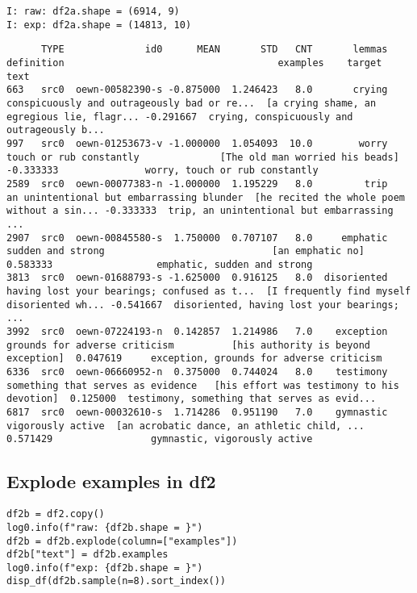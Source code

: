 \documentclass[a4paper,10pt,onecolumn,oneside,openright]{article}
\begin{document}
\begin{verbatim}
I: raw: df2a.shape = (6914, 9)
I: exp: df2a.shape = (14813, 10)
\end{verbatim}
\begin{verbatim}
      TYPE              id0      MEAN       STD   CNT       lemmas                                   definition                                     examples    target                                         text
663   src0  oewn-00582390-s -0.875000  1.246423   8.0       crying  conspicuously and outrageously bad or re...  [a crying shame, an egregious lie, flagr... -0.291667  crying, conspicuously and outrageously b...
997   src0  oewn-01253673-v -1.000000  1.054093  10.0        worry                      touch or rub constantly              [The old man worried his beads] -0.333333               worry, touch or rub constantly
2589  src0  oewn-00077383-n -1.000000  1.195229   8.0         trip    an unintentional but embarrassing blunder  [he recited the whole poem without a sin... -0.333333  trip, an unintentional but embarrassing ...
2907  src0  oewn-00845580-s  1.750000  0.707107   8.0     emphatic                            sudden and strong                             [an emphatic no]  0.583333                  emphatic, sudden and strong
3813  src0  oewn-01688793-s -1.625000  0.916125   8.0  disoriented  having lost your bearings; confused as t...  [I frequently find myself disoriented wh... -0.541667  disoriented, having lost your bearings; ...
3992  src0  oewn-07224193-n  0.142857  1.214986   7.0    exception                grounds for adverse criticism          [his authority is beyond exception]  0.047619     exception, grounds for adverse criticism
6336  src0  oewn-06660952-n  0.375000  0.744024   8.0    testimony            something that serves as evidence   [his effort was testimony to his devotion]  0.125000  testimony, something that serves as evid...
6817  src0  oewn-00032610-s  1.714286  0.951190   7.0    gymnastic                            vigorously active  [an acrobatic dance, an athletic child, ...  0.571429                 gymnastic, vigorously active
\end{verbatim}
\subsection{Explode examples in df2}
\label{sec:org7722ecc}
\begin{verbatim}
df2b = df2.copy()
log0.info(f"raw: {df2b.shape = }")
df2b = df2b.explode(column=["examples"])
df2b["text"] = df2b.examples
log0.info(f"exp: {df2b.shape = }")
disp_df(df2b.sample(n=8).sort_index())
\end{verbatim}
\end{document}
